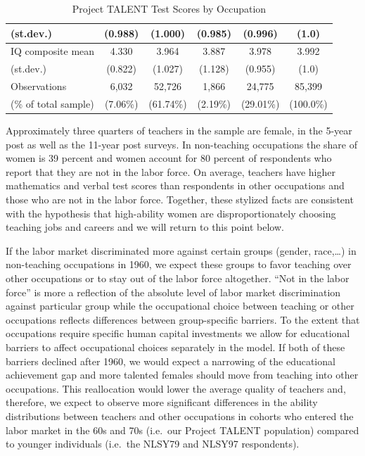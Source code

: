 \documentclass[onehalfspacing,11pt]{article}
\begin{document}
\begin{table}[h!]
\begin{tabular}{lccccc}
			\quad (st.dev.) & (0.988) & (1.000) & (0.985) & (0.996) & (1.0)\\
			\midrule
			IQ composite mean & 4.330 & 3.964 & 3.887 & 3.978 & 3.992\\
			\quad (st.dev.) & (0.822) & (1.027) & (1.128) & (0.955) & (1.0)\\
			\midrule
			Observations & 6,032 & 52,726 & 1,866 & 24,775 & 85,399\\
			\quad (\% of total sample) & (7.06\%) & (61.74\%) & (2.19\%) & (29.01\%) &(100.0\%)\\
			\bottomrule
		\end{tabular}
		\caption{Project TALENT Test Scores by Occupation}
		\label{tab:PTscores}
	\end{table}
	
Approximately three quarters of teachers in the sample are female, in the 5-year post as well as the 11-year post surveys. In non-teaching occupations the share of women is 39 percent and women account for 80 percent of respondents who report that they are not in the labor force. On average, teachers have higher mathematics and verbal test scores than respondents in other occupations and those who are not in the labor force. Together, these stylized facts are consistent with the hypothesis that high-ability women are disproportionately choosing teaching jobs and careers and we will return to this point below.
	
If the labor market discriminated more against certain groups (gender, race,\ldots) in non-teaching occupations in 1960, we expect these groups to favor teaching over other occupations or to stay out of the labor force altogether. ``Not in the labor force'' is more a reflection of the absolute level of labor market discrimination against particular group while the occupational choice between teaching or other occupations reflects differences between group-specific barriers. To the extent that occupations require specific human capital investments we allow for educational barriers to affect occupational choices separately in the model. If both of these barriers declined after 1960, we would expect a narrowing of the educational achievement gap and more talented females should move from teaching into other occupations. This reallocation would lower the average quality of teachers and, therefore, we expect to observe more significant differences in the ability distributions between teachers and other occupations in cohorts who entered the labor market in the 60s and 70s (i.e.~our Project TALENT population) compared to younger individuals (i.e.~the NLSY79 and NLSY97 respondents).
\end{document}
